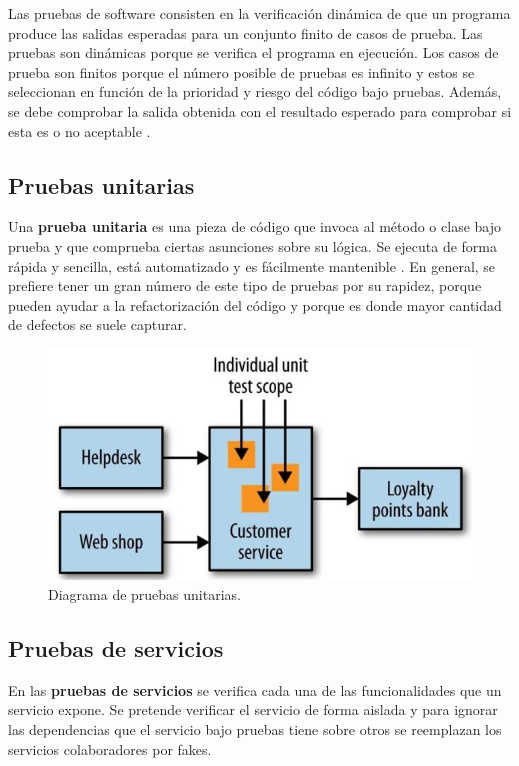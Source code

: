 \documentclass[11pt,spanish,listoffigures]{tfgetsinf}
\begin{document}
Las pruebas de software consisten en la verificación dinámica de que un programa produce las salidas esperadas para un conjunto finito de casos de prueba. Las pruebas son dinámicas porque se verifica el programa en ejecución. Los casos de prueba son finitos porque el número posible de pruebas es infinito y estos se seleccionan en función de la prioridad y riesgo del código bajo pruebas. Además, se debe comprobar la salida obtenida con el resultado esperado para comprobar si esta es o no aceptable \cite{Bourque2014}.

\subsection{Pruebas unitarias}

Una \textbf{prueba unitaria} es una pieza de código que invoca al método o clase bajo prueba y que comprueba ciertas asunciones sobre su lógica. Se ejecuta de forma rápida y sencilla, está automatizado y es fácilmente mantenible \cite{Osherove2014}. En general, se prefiere tener un gran número de este tipo de pruebas por su rapidez, porque pueden ayudar a la refactorización del código y porque es donde mayor cantidad de defectos se suele capturar.

\begin{figure}[h]
\centering
\includegraphics[scale=0.5]{Unit_Tests}
\caption{Diagrama de pruebas unitarias.}
\end{figure}

\subsection{Pruebas de servicios}

En las \textbf{pruebas de servicios} se verifica cada una de las funcionalidades que un servicio expone. Se pretende verificar el servicio de forma aislada y para ignorar las dependencias que el servicio bajo pruebas tiene sobre otros se reemplazan los servicios colaboradores por fakes.
\end{document}
